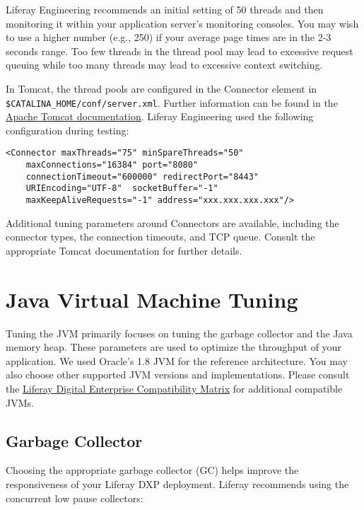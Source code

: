 Liferay Engineering recommends an initial setting of 50 threads and then
monitoring it within your application server's monitoring consoles. You
may wish to use a higher number (e.g., 250) if your average page times
are in the 2-3 seconds range. Too few threads in the thread pool may
lead to excessive request queuing while too many threads may lead to
excessive context switching.

In Tomcat, the thread pools are configured in the Connector element in
\texttt{\$CATALINA\_HOME/conf/server.xml}. Further information can be
found in the
\href{https://tomcat.apache.org/tomcat-8.0-doc/config/http.html}{Apache
Tomcat documentation}. Liferay Engineering used the following
configuration during testing:

\begin{verbatim}
<Connector maxThreads="75" minSpareThreads="50" 
    maxConnections="16384" port="8080"     
    connectionTimeout="600000" redirectPort="8443" 
    URIEncoding="UTF-8"  socketBuffer="-1"     
    maxKeepAliveRequests="-1" address="xxx.xxx.xxx.xxx"/>
\end{verbatim}

Additional tuning parameters around Connectors are available, including
the connector types, the connection timeouts, and TCP queue. Consult the
appropriate Tomcat documentation for further details.

\section{Java Virtual Machine
Tuning}\label{java-virtual-machine-tuning}

Tuning the JVM primarily focuses on tuning the garbage collector and the
Java memory heap. These parameters are used to optimize the throughput
of your application. We used Oracle's 1.8 JVM for the reference
architecture. You may also choose other supported JVM versions and
implementations. Please consult the
\href{https://web.liferay.com/group/customer/dxp/support/compatibility-matrix}{Liferay
Digital Enterprise Compatibility Matrix} for additional compatible JVMs.

\subsection{Garbage Collector}\label{garbage-collector}

Choosing the appropriate garbage collector (GC) helps improve the
responsiveness of your Liferay DXP deployment. Liferay recommends using
the concurrent low pause collectors:

